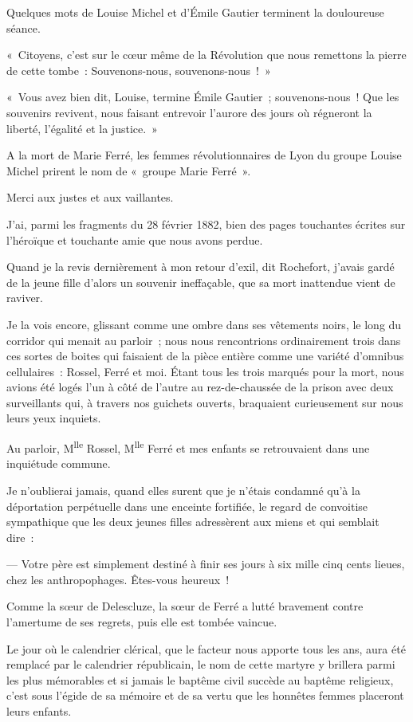 \documentclass[french,twoside]{book} %
\newenvironment{quoteblock}%
  {\begin{quoting}}
  {\end{quoting}}
\newenvironment{quotebar}{%
    \def\FrameCommand{{\color{rubric!10!}\vrule width 0.5em} \hspace{0.9em}}%
    \def\OuterFrameSep{\itemsep} %
    \MakeFramed {\advance\hsize-\width \FrameRestore}
  }%
  {%
    \endMakeFramed
  }
\renewenvironment{quoteblock}%
  {%
    \savenotes
    \setstretch{0.9}
    \normalfont
    \begin{quotebar}
  }
  {%
    \end{quotebar}
    \spewnotes
  }
\begin{document}
\noindent Quelques mots de Louise Michel et d’Émile Gautier terminent la douloureuse séance.\par
« Citoyens, c’est sur le cœur même de la Révolution que nous remettons la pierre de cette tombe : Souvenons-nous, souvenons-nous ! »\par
« Vous avez bien dit, Louise, termine Émile  Gautier ; souvenons-nous ! Que les souvenirs revivent, nous faisant entrevoir l’aurore des jours où régneront la liberté, l’égalité et la justice. »\par
A la mort de Marie Ferré, les femmes révolutionnaires de Lyon du groupe Louise Michel prirent le nom de « groupe Marie Ferré ».\par
Merci aux justes et aux vaillantes.\par
J’ai, parmi les fragments du 28 février 1882, bien des pages touchantes écrites sur l’héroïque et touchante amie que nous avons perdue.\par

\begin{quoteblock}
 \noindent Quand je la revis dernièrement à mon retour d’exil, dit Rochefort, j’avais gardé de la jeune fille d’alors un souvenir ineffaçable, que sa mort inattendue vient de raviver.\par
 Je la vois encore, glissant comme une ombre dans ses vêtements noirs, le long du corridor qui menait au parloir ; nous nous rencontrions ordinairement trois dans ces sortes de boites qui faisaient de la pièce entière comme une variété d’omnibus cellulaires : Rossel, Ferré et moi. Étant tous les trois marqués pour la mort, nous avions été logés l’un à côté de l’autre au rez-de-chaussée de la prison avec deux surveillants qui, à travers nos guichets ouverts, braquaient curieusement sur nous leurs yeux inquiets.\par
 Au parloir, M\textsuperscript{lle} Rossel, M\textsuperscript{lle} Ferré et mes enfants se retrouvaient dans une inquiétude commune.\par
 Je n’oublierai jamais, quand elles surent que je n’étais condamné qu’à la déportation perpétuelle dans une enceinte fortifiée, le regard de convoitise sympathique que les deux jeunes filles adressèrent aux miens et qui semblait dire :\par
   — Votre père est simplement destiné à finir ses jours à six mille cinq cents lieues, chez les anthropophages. Êtes-vous heureux !\par
 Comme la sœur de Delescluze, la sœur de Ferré a lutté bravement contre l’amertume de ses regrets, puis elle est tombée vaincue.\par
 Le jour où le calendrier clérical, que le facteur nous apporte tous les ans, aura été remplacé par le calendrier républicain, le nom de cette martyre y brillera parmi les plus mémorables et si jamais le baptême civil succède au baptême religieux, c’est sous l’égide de sa mémoire et de sa vertu que les honnêtes femmes placeront leurs enfants.
 \end{quoteblock}
\end{document}
